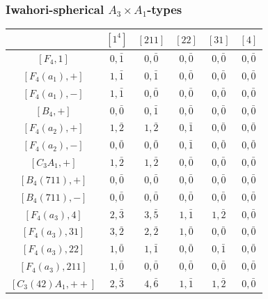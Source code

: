 \begin{landscape}
    \centering
    \newpage
    \subsubsection*{Iwahori-spherical \texorpdfstring{$A_3\times A_1$}{PDFstring}-types}
    \iffalse
    \begin{table}[h]
        \centering
        \begin{minipage}{0.40\textwidth}
            \centering
            \begin{tabular}{|c|ccccc|}
                \hline
                & $[1^4]$ & $[211]$ & $[22]$ & $[31]$ & $[4]$ \\\hline
                $[F_4,1]$ & $0,\bar1$ & $0,\bar0$ & $0,\bar0$ & $0,\bar0$ & $0,\bar0$ \\\hline
                $[F_4(a_1),+]$ & $1,\bar1$ & $0,\bar1$ & $0,\bar0$ & $0,\bar0$ & $0,\bar0$ \\
                $[F_4(a_1),-]$ & $1,\bar1$ & $0,\bar0$ & $0,\bar0$ & $0,\bar0$ & $0,\bar0$ \\
                $[B_4,+]$ & $0,\bar0$ & $0,\bar1$ & $0,\bar0$ & $0,\bar0$ & $0,\bar0$ \\\hline
                $[F_4(a_2),+]$ & $1,\bar2$ & $1,\bar2$ & $0,\bar1$ & $0,\bar0$ & $0,\bar0$ \\
                $[F_4(a_2),-]$ & $0,\bar0$ & $0,\bar0$ & $0,\bar1$ & $0,\bar0$ & $0,\bar0$ \\
                $[C_3A_1,+]$ & $1,\bar2$ & $1,\bar2$ & $0,\bar0$ & $0,\bar0$ & $0,\bar0$ \\\hline
                $[B_4(711),+]$ & $0,\bar0$ & $0,\bar0$ & $0,\bar0$ & $0,\bar0$ & $0,\bar0$ \\
                $[B_4(711),-]$ & $0,\bar0$ & $0,\bar0$ & $0,\bar0$ & $0,\bar0$ & $0,\bar0$ \\\hline
                $[F_4(a_3),4]$ & $2,\bar{3}$ & $3,\bar{5}$ & $1,\bar1$ & $1,\bar2$ & $0,\bar0$ \\
                $[F_4(a_3),31]$ & $3,\bar2$ & $2,\bar2$ & $1,\bar0$ & $0,\bar0$ & $0,\bar0$ \\
                $[F_4(a_3),22]$ & $1,\bar0$ & $1,\bar1$ & $0,\bar0$ & $0,\bar1$ & $0,\bar0$ \\
                $[F_4(a_3),211]$ & $1,\bar0$ & $0,\bar0$ & $0,\bar0$ & $0,\bar0$ & $0,\bar0$ \\
                $[C_3(42)A_1,++]$ & $2,\bar{3}$ & $4,\bar{6}$ & $1,\bar1$ & $1,\bar2$ & $0,\bar0$ \\

\end{tabular}
\end{minipage}
\end{table}
\end{landscape}
